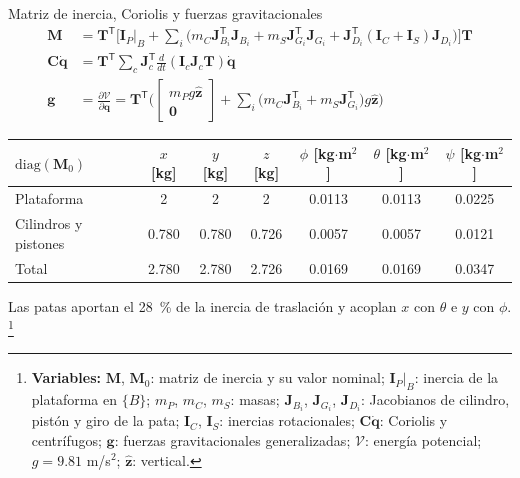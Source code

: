 \documentclass[aspectratio=169,10pt]{beamer}
\newcommand{\vect}[1]{\bm{#1}}
\newcommand{\T}{^{\mathsf{T}}}
\newcommand{\variables}[1]{\begingroup\renewcommand{\thefootnote}{}\footnote[frame]{\textbf{Variables:} #1}\addtocounter{footnote}{-1}\endgroup}
\begin{document}
\begin{frame}{Matriz de inercia, Coriolis y fuerzas gravitacionales}
\small
\begin{align*}
\vect M &= \vect T\T\Big[\vect I_P|_B + \sum_i\big(m_C\vect J_{B_i}\T\vect J_{B_i} + m_S\vect J_{G_i}\T\vect J_{G_i} + \vect J_{D_i}\T(\vect I_C + \vect I_S)\vect J_{D_i}\big)\Big]\vect T\\
\vect C\dot{\vect q} &= \vect T\T\sum_c\vect J_c\T\tfrac{d}{dt}\left(\vect I_c\vect J_c\vect T\right)\dot{\vect q}\\
\vect g &= \tfrac{\partial\mathcal V}{\partial\vect q} = \vect T\T\Big(\begin{bmatrix}m_Pg\hat{\vect z}\\ \vect 0\end{bmatrix} + \sum_i\big(m_C\vect J_{B_i}\T + m_S\vect J_{G_i}\T\big)g\hat{\vect z}\Big)
\end{align*}
\par\smallskip
{\centering\scriptsize
\begin{tabular}{@{}lcccccc@{}}
\toprule
$\mathrm{diag}(\vect M_0)$ & $x$ [kg] & $y$ [kg] & $z$ [kg] & $\phi$ [kg$\cdot$m$^2$] & $\theta$ [kg$\cdot$m$^2$] & $\psi$ [kg$\cdot$m$^2$] \\
\midrule
Plataforma & 2 & 2 & 2 & 0.0113 & 0.0113 & 0.0225 \\
Cilindros y pistones & 0.780 & 0.780 & 0.726 & 0.0057 & 0.0057 & 0.0121 \\
\midrule
Total & 2.780 & 2.780 & 2.726 & 0.0169 & 0.0169 & 0.0347 \\
\bottomrule
\end{tabular}\par}
\smallskip
Las patas aportan el 28~\% de la inercia de traslación y acoplan $x$ con $\theta$ e $y$ con $\phi$.
\variables{$\vect M$, $\vect M_0$: matriz de inercia y su valor nominal; $\vect I_P|_B$: inercia de la plataforma en $\{B\}$; $m_P$, $m_C$, $m_S$: masas; $\vect J_{B_i}$, $\vect J_{G_i}$, $\vect J_{D_i}$: Jacobianos de cilindro, pistón y giro de la pata; $\vect I_C$, $\vect I_S$: inercias rotacionales; $\vect C\dot{\vect q}$: Coriolis y centrífugos; $\vect g$: fuerzas gravitacionales generalizadas; $\mathcal V$: energía potencial; $g = 9.81$ m/s$^2$; $\hat{\vect z}$: vertical.}
\end{frame}
\end{document}

